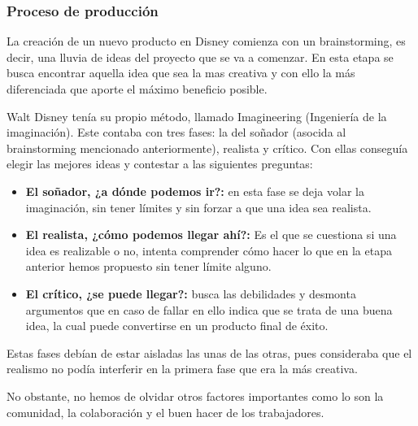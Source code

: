 \subsubsection{Proceso de producción}
La creación de un nuevo producto en Disney comienza con un brainstorming, es decir, una lluvia de ideas del proyecto que se va a comenzar. En esta etapa se busca encontrar aquella idea que sea la mas creativa y con ello la más diferenciada que aporte el máximo beneficio posible.

Walt Disney tenía su propio método, llamado Imagineering (Ingeniería de la imaginación). Este contaba con tres fases: la del soñador (asocida al brainstorming mencionado anteriormente), realista y crítico. Con ellas conseguía elegir las mejores ideas y contestar a las siguientes preguntas:

\begin{itemize}

\item
\textbf{El soñador, ¿a dónde podemos ir?:} en esta fase se deja volar la imaginación, sin tener límites y sin forzar a que una idea sea realista.

\item
\textbf{El realista, ¿cómo podemos llegar ahí?:} Es el que se cuestiona si una idea es realizable o no, intenta comprender cómo hacer lo que en la etapa anterior hemos propuesto sin tener límite alguno.

\item
\textbf{El crítico, ¿se puede llegar?:} busca las debilidades y desmonta argumentos que en caso de fallar en ello indica que se trata de una buena idea, la cual puede convertirse en un producto final de éxito.

\end{itemize}
Estas fases debían de estar aisladas las unas de las otras, pues consideraba que el realismo no podía interferir en la primera fase que era la más creativa.

No obstante, no hemos de olvidar otros factores importantes como lo son la comunidad, la colaboración y el buen hacer de los trabajadores.

